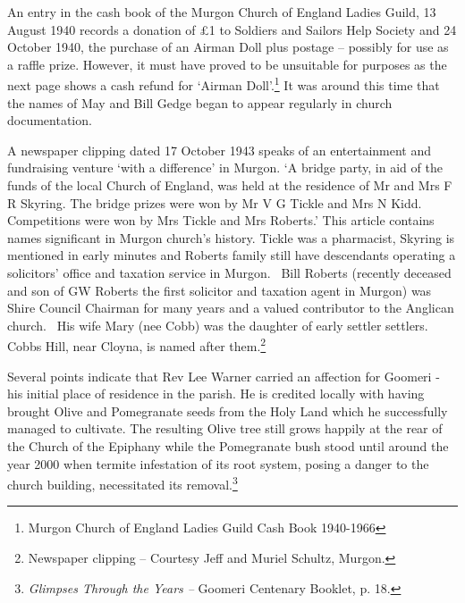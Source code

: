 An entry in the cash book of the Murgon Church of England Ladies Guild, 13 August 1940 records a donation of £1 to Soldiers and Sailors Help Society and 24 October 1940, the purchase of an Airman Doll plus postage -- possibly for use as a raffle prize. However, it must have proved to be unsuitable for purposes as the next page shows a cash refund for `Airman Doll'.\footnote{Murgon Church of England Ladies Guild Cash Book 1940-1966} It was around this time that the names of May and Bill Gedge began to appear regularly in church documentation.

A newspaper clipping dated 17 October 1943 speaks of an entertainment and fundraising venture `with a difference' in Murgon. `A bridge party, in aid of the funds of the local Church of England, was held at the residence of Mr and Mrs F R Skyring. The bridge prizes were won by Mr V G Tickle and Mrs N Kidd. Competitions were won by Mrs Tickle and Mrs Roberts.' This article contains names significant in Murgon church's history. Tickle was a pharmacist, Skyring is mentioned in early minutes and Roberts family still have descendants operating a solicitors' office and taxation service in Murgon.~ Bill Roberts (recently deceased and son of GW Roberts the first solicitor and taxation agent in Murgon) was Shire Council Chairman for many years and a valued contributor to the Anglican church.~ His wife Mary (nee Cobb) was the daughter of early settler settlers.~ Cobbs Hill, near Cloyna, is named after them.\footnote{Newspaper clipping -- Courtesy Jeff and Muriel Schultz, Murgon.}

Several points indicate that Rev Lee Warner carried an affection for Goomeri - his initial place of residence in the parish. He is credited locally with having brought Olive and Pomegranate seeds from the Holy Land which he successfully managed to cultivate. The resulting Olive tree still grows happily at the rear of the Church of the Epiphany while the Pomegranate bush stood until around the year 2000 when termite infestation of its root system, posing a danger to the church building, necessitated its removal.\footnote{\emph{Glimpses Through the Years --} Goomeri Centenary Booklet, p. 18.}

